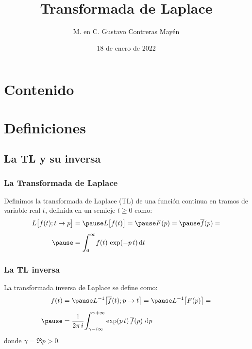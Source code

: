\documentclass[12pt]{beamer}
\date{18 de enero de 2022}
\title{\large{Transformada de Laplace}}
\author{M. en C. Gustavo Contreras Mayén}
\begin{document}
\maketitle
\fontsize{14}{14}\selectfont
{}

\section*{Contenido}


\section{Definiciones}
\subsection{La TL y su inversa}

\begin{frame}
\frametitle{La Transformada de Laplace}
Definimos la transformada de Laplace (TL) de una función continua en tramos de variable real $t$, definida en un semieje $t \geq 0$ como:
\pause
\begin{eqnarray}
\begin{aligned}
L \big[f(t); t \to p\big] &= \pause L \big[f(t)\big] = \pause F(p) = \pause \overline{f}(p) = \\[0.5em] \pause
&= \scaleint{6ex}_{\bs 0}^{\infty} f(t) \, \exp(-p \, t) \dd{t}
\end{aligned}
\label{eq:ecuacion_03_03}
\end{eqnarray}
\end{frame}
\begin{frame}
\frametitle{La TL inversa}
La transformada inversa de Laplace se define como:
\pause
\begin{eqnarray}
\begin{aligned}
f(t) &= \pause L^{-1} \big[\overline{f}(t); p \to t\big] = \pause L^{-1} \big[F(p)\big] = \\[0.5em] \pause
&= \dfrac{1}{2 \pi \, i} \scaleint{6ex}_{\bs \gamma-i \infty}^{\gamma+\infty} \exp(p \, t) \, \overline{f} (p) \, \dd{p}
\end{aligned}
\label{eq:ecuacion_03_04}
\end{eqnarray}
donde $\gamma = \Re{p} > 0$.
\end{frame}
\end{document}
